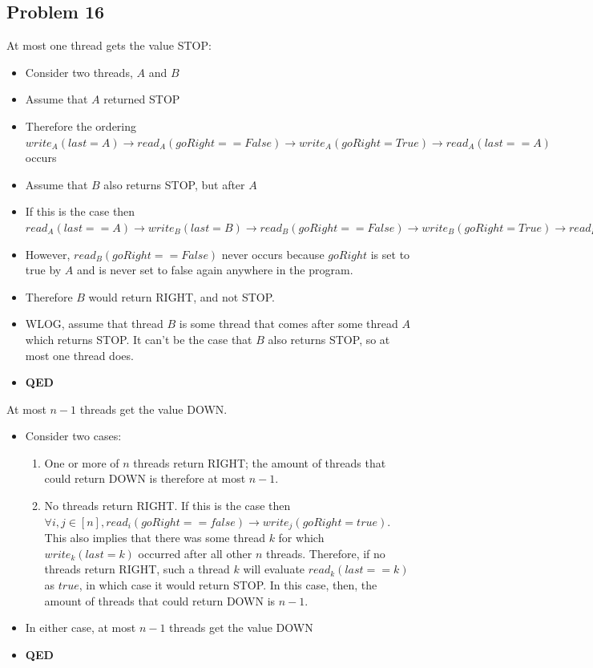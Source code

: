 \documentclass[]{article}
\begin{document}
\subsection{Problem 16}
At most one thread gets the value STOP:
\begin{itemize}
	\item Consider two threads, $A$ and $B$
	\item Assume that $A$ returned STOP
	\item Therefore the ordering $write_A(last = A) \rightarrow read_A(goRight == False)\rightarrow write_A(goRight = True) \rightarrow read_A(last == A)$ occurs
	\item Assume that $B$ also returns STOP, but after $A$
	\item If this is the case then $read_A(last == A) \rightarrow write_B(last = B) \rightarrow read_B(goRight == False) \rightarrow write_B(goRight = True) \rightarrow read_B(last == B)$
	\item However, $read_B(goRight == False)$ never occurs because $goRight$ is set to true by $A$ and is never set to false again anywhere in the program.
	\item Therefore $B$ would return RIGHT, and not STOP.
	\item WLOG, assume that thread $B$ is some thread that comes after some thread $A$ which returns STOP. It can't be the case that $B$ also returns STOP, so at most one thread does.
	\item \textbf{QED}
\end{itemize}
At most $n - 1$ threads get the value DOWN.
\begin{itemize}
	\item Consider two cases:
	\begin{enumerate}
		\item One or more of $n$ threads return RIGHT; the amount of threads that could return DOWN is therefore at most $n - 1$.
		\item No threads return RIGHT. If this is the case then $\forall i, j \in [n], read_i(goRight == false) \rightarrow write_j(goRight = true)$. This also implies that there was some thread $k$ for which $write_k(last = k)$ occurred after all other $n$ threads. Therefore, if no threads return RIGHT, such a thread $k$ will evaluate $read_k(last == k)$ as $true$, in which case it would return STOP. In this case, then, the amount of threads that could return DOWN is $n - 1$.
	\end{enumerate}
	\item In either case, at most $n - 1$ threads get the value DOWN
	\item \textbf{QED}
\end{itemize}
\end{document}
